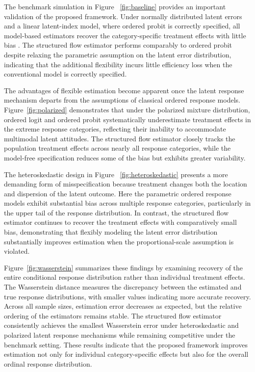 \documentclass{article}
\begin{document}
The benchmark simulation in Figure ~\ref{fig:baseline} provides an important validation of the proposed framework. Under normally distributed latent errors and a linear latent-index model, where ordered probit is correctly specified, all model-based estimators recover the category-specific treatment effects with little bias . The structured flow estimator performs comparably to ordered probit despite relaxing the parametric assumption on the latent error distribution, indicating that the additional flexibility incurs little efficiency loss when the conventional model is correctly specified.

The advantages of flexible estimation become apparent once the latent response mechanism departs from the assumptions of classical ordered response models. Figure~\ref{fig:polarized} demonstrates that under the polarized mixture distribution, ordered logit and ordered probit systematically underestimate treatment effects in the extreme response categories, reflecting their inability to accommodate multimodal latent attitudes. The structured flow estimator closely tracks the population treatment effects across nearly all response categories, while the model-free specification reduces some of the bias but exhibits greater variability.

The heteroskedastic design in Figure ~\ref{fig:heteroskedastic} presents a more demanding form of misspecification because treatment changes both the location and dispersion of the latent outcome. Here the parametric ordered response models exhibit substantial bias across multiple response categories, particularly in the upper tail of the response distribution. In contrast, the structured flow estimator continues to recover the treatment effects with comparatively small bias, demonstrating that flexibly modeling the latent error distribution substantially improves estimation when the proportional-scale assumption is violated.

Figure~\ref{fig:wasserstein} summarizes these findings by examining recovery of the entire conditional response distribution rather than individual treatment effects. The Wasserstein distance measures the discrepancy between the estimated and true response distributions, with smaller values indicating more accurate recovery. Across all sample sizes, estimation error decreases as expected, but the relative ordering of the estimators remains stable. The structured flow estimator consistently achieves the smallest Wasserstein error under heteroskedastic and polarized latent response mechanisms while remaining competitive under the benchmark setting. These results indicate that the proposed framework improves estimation not only for individual category-specific effects but also for the overall ordinal response distribution.
\end{document}
